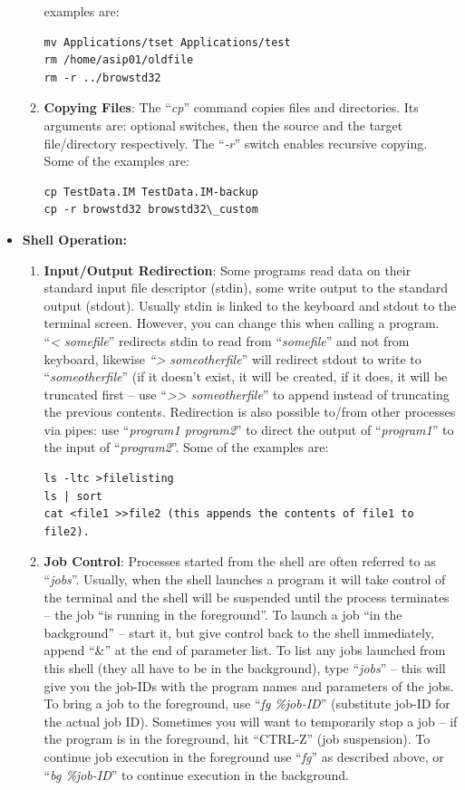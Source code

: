 \begin{itemize}
\begin{enumerate}
  examples are:
\begin{lstlisting}
mv Applications/tset Applications/test
rm /home/asip01/oldfile
rm -r ../browstd32
\end{lstlisting}
\item
  \textbf{Copying Files}: The ``\emph{cp}'' command copies files and
  directories. Its arguments are: optional switches, then the source and
  the target file/directory respectively. The ``\emph{‑r}'' switch
  enables recursive copying. Some of the examples are:
\begin{lstlisting}
cp TestData.IM TestData.IM-backup
cp -r browstd32 browstd32\_custom
\end{lstlisting}
\end{enumerate}
\item \textbf{Shell Operation:}

  \begin{enumerate}
  \item
    \textbf{Input/Output Redirection}: Some programs read data on their
    standard input file descriptor (stdin), some write output to the
    standard output (stdout). Usually stdin is linked to the keyboard
    and stdout to the terminal screen. However, you can change this when
    calling a program. ``\emph{\textless{} somefile}'' redirects stdin
    to read from ``\emph{somefile}'' and not from keyboard, likewise
    \emph{``\textgreater{} someotherfile}'' will redirect stdout to
    write to ``\emph{someotherfile}'' (if it doesn't exist, it will be
    created, if it does, it will be truncated first -- use
    ``\emph{\textgreater\textgreater{} someotherfile}'' to append
    instead of truncating the previous contents. Redirection is also
    possible to/from other processes via pipes: use ``\emph{program1
    \textbar{} program2}'' to direct the output of ``\emph{program1}''
    to the input of ``\emph{program2}''. Some of the examples are:
\begin{lstlisting}
ls -ltc >filelisting
ls | sort
cat <file1 >>file2 (this appends the contents of file1 to file2).
\end{lstlisting}
\item \textbf{Job Control}: Processes started from the shell are often
  referred to as ``\emph{jobs}''. Usually, when the shell launches a
  program it will take control of the terminal and the shell will be
  suspended until the process terminates -- the job ``is running in the
  foreground''. To launch a job ``in the background'' -- start it, but
  give control back to the shell immediately, append ``\&'' at the end
  of parameter list. To list any jobs launched from this shell (they all
  have to be in the background), type ``\emph{jobs}'' -- this will give
  you the job-IDs with the program names and parameters of the jobs. To
  bring a job to the foreground, use ``\emph{fg \%job-ID}'' (substitute
  job-ID for the actual job ID). Sometimes you will want to temporarily
  stop a job -- if the program is in the foreground, hit ``CTRL-Z'' (job
  suspension). To continue job execution in the foreground use
  ``\emph{fg}'' as described above, or ``\emph{bg \%job-ID}'' to
  continue execution in the background.
\end{enumerate}


\end{itemize}
